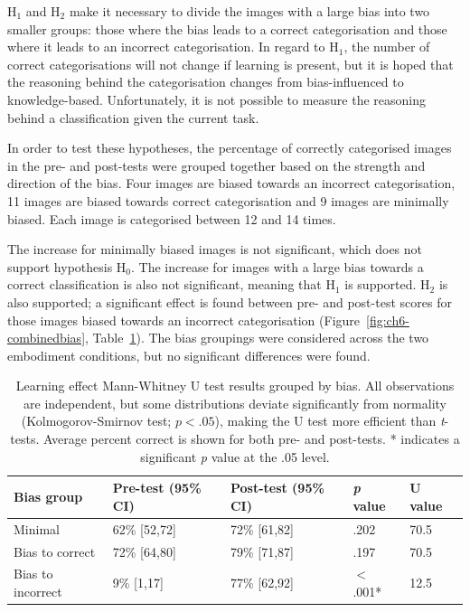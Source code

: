 H$_{1}$ and H$_{2}$ make it necessary to divide the images with a large bias into two smaller groups: those where the bias leads to a correct categorisation and those where it leads to an incorrect categorisation. In regard to H$_{1}$, the number of correct categorisations will not change if learning is present, but it is hoped that the reasoning behind the categorisation changes from bias-influenced to knowledge-based. Unfortunately, it is not possible to measure the reasoning behind a classification given the current task.

In order to test these hypotheses, the percentage of correctly categorised images in the pre- and post-tests were grouped together based on the strength and direction of the bias. Four images are biased towards an incorrect categorisation, 11 images are biased towards correct categorisation and 9 images are minimally biased. Each image is categorised between 12 and 14 times.

The increase for minimally biased images is not significant, which does not support hypothesis H$_{0}$. The increase for images with a large bias towards a correct classification is also not significant, meaning that H$_{1}$ is supported. H$_{2}$ is also supported; a significant effect is found between pre- and post-test scores for those images biased towards an incorrect categorisation (Figure~\ref{fig:ch6-combinedbias}, Table~\ref{tab:ch6-biasgroups}). The bias groupings were considered across the two embodiment conditions, but no significant differences were found.

\begin{table}[t!]
	\centering
	\renewcommand{\arraystretch}{1.2} 
	\begin{tabular}{@{}p{3cm}p{3.2cm}p{3.2cm}p{1.5cm}p{1.9cm}@{}}
	\toprule
	\textbf{Bias group} & \textbf{Pre-test (95\% CI)} & \textbf{Post-test (95\% CI)} & \textbf{\textit{p} value} & \textbf{U value} \\ \midrule
	Minimal 			& 62\% [52,72] 	& 72\% [61,82] 	& .202		& 70.5 \\
	Bias to correct 	& 72\% [64,80]	& 79\% [71,87] 	& .197		& 70.5 \\
	Bias to incorrect 	& 9\% [1,17]	& 77\% [62,92] 	& $<$.001* 	& 12.5 \\ \bottomrule
	\end{tabular}
	\caption{Learning effect Mann-Whitney U test results grouped by bias. All observations are independent, but some distributions deviate significantly from normality (Kolmogorov-Smirnov test; $\textit{p}<.05$), making the U test more efficient than \textit{t}-tests. Average percent correct is shown for both pre- and post-tests. * indicates a significant \textit{p} value at the .05 level.}
	\label{tab:ch6-biasgroups}
\end{table}

